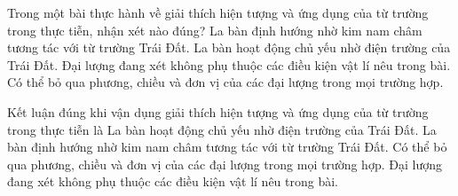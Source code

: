 \begin{ex}
Trong một bài thực hành về giải thích hiện tượng và ứng dụng của từ trường trong thực tiễn, nhận xét nào đúng?
\choice
{\True La bàn định hướng nhờ kim nam châm tương tác với từ trường Trái Đất.}
{La bàn hoạt động chủ yếu nhờ điện trường của Trái Đất.}
{Đại lượng đang xét không phụ thuộc các điều kiện vật lí nêu trong bài.}
{Có thể bỏ qua phương, chiều và đơn vị của các đại lượng trong mọi trường hợp.}
\end{ex}

\begin{ex}
Kết luận đúng khi vận dụng giải thích hiện tượng và ứng dụng của từ trường trong thực tiễn là
\choice
{La bàn hoạt động chủ yếu nhờ điện trường của Trái Đất.}
{\True La bàn định hướng nhờ kim nam châm tương tác với từ trường Trái Đất.}
{Có thể bỏ qua phương, chiều và đơn vị của các đại lượng trong mọi trường hợp.}
{Đại lượng đang xét không phụ thuộc các điều kiện vật lí nêu trong bài.}
\end{ex}

